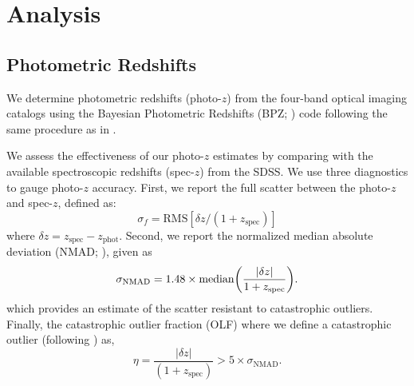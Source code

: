 \documentclass[apj, revtex4-1]{emulateapj}
\begin{document}
\section{Analysis}\label{sec:analysis}
\subsection{Photometric Redshifts}
We determine photometric redshifts (photo-$z$) from the four-band optical imaging catalogs using the Bayesian Photometric Redshifts (BPZ; \citealt{Benitez2000, Coe2006}) code following the same procedure as in \cite{Menanteau2009a}.

We assess the effectiveness of our photo-$z$ estimates by comparing with the available spectroscopic redshifts (spec-$z$) from the SDSS. We use three diagnostics to gauge photo-$z$ accuracy. First, we report the full scatter between the photo-$z$ and spec-$z$, defined as:
\begin{equation}\label{eqn:scatter}
	\sigma_f = \mathrm{RMS}[\delta z/(1+z_\mathrm{spec})]
\end{equation}
where $\delta z = z_\mathrm{spec} - z_\mathrm{phot}$. Second, we report the normalized median absolute deviation (NMAD; \citealt{Ilbert2009, Dahlen2013, Molino2017}), given as
\begin{equation}\label{eqn:nmad}
	\sigma_\mathrm{NMAD} = 1.48 \times \mathrm{median} \bigg{(} \frac{|\delta z|}{1+z_\mathrm{spec}} \bigg{)}.
\end{equation}
which provides an estimate of the scatter resistant to catastrophic outliers. Finally, the catastrophic outlier fraction (OLF) where we define a catastrophic outlier (following \citealt{Molino2017}) as,
\begin{equation}\label{eqn:OLF}
	\eta = \frac{|\delta z|}{(1+z_\mathrm{spec})} > 5 \times \sigma_\mathrm{NMAD}.
\end{equation}
\end{document}
